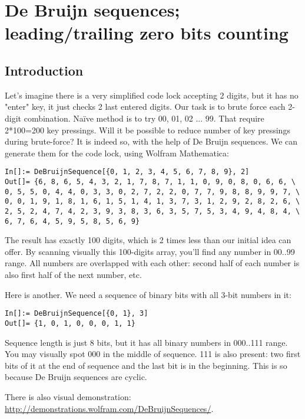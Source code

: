 \section{De Bruijn sequences; leading/trailing zero bits counting}
\label{DeBruijn}

\subsection{Introduction}

Let's imagine there is a very simplified code lock accepting 2 digits, but it has no "enter" key, it just checks 2 last entered digits.
Our task is to brute force each 2-digit combination.
Naïve method is to try 00, 01, 02 ... 99.
That require 2*100=200 key pressings.
Will it be possible to reduce number of key pressings during brute-force?
It is indeed so, with the help of De Bruijn sequences.
We can generate them for the code lock, using Wolfram Mathematica:

\begin{lstlisting}
In[]:= DeBruijnSequence[{0, 1, 2, 3, 4, 5, 6, 7, 8, 9}, 2]
Out[]= {6, 8, 6, 5, 4, 3, 2, 1, 7, 8, 7, 1, 1, 0, 9, 0, 8, 0, 6, 6, \
0, 5, 5, 0, 4, 4, 0, 3, 3, 0, 2, 7, 2, 2, 0, 7, 7, 9, 8, 8, 9, 9, 7, \
0, 0, 1, 9, 1, 8, 1, 6, 1, 5, 1, 4, 1, 3, 7, 3, 1, 2, 9, 2, 8, 2, 6, \
2, 5, 2, 4, 7, 4, 2, 3, 9, 3, 8, 3, 6, 3, 5, 7, 5, 3, 4, 9, 4, 8, 4, \
6, 7, 6, 4, 5, 9, 5, 8, 5, 6, 9}
\end{lstlisting}

The result has exactly 100 digits, which is 2 times less than our initial idea can offer.
By scanning visually this 100-digits array, you'll find any number in 00..99 range.
All numbers are overlapped with each other: second half of each number is also first half of the next number, etc.

Here is another. We need a sequence of binary bits with all 3-bit numbers in it:

\begin{lstlisting}
In[]:= DeBruijnSequence[{0, 1}, 3]
Out[]= {1, 0, 1, 0, 0, 0, 1, 1}
\end{lstlisting}

Sequence length is just 8 bits, but it has all binary numbers in 000..111 range.
You may visually spot 000 in the middle of sequence.
111 is also present: two first bits of it at the end of sequence and the last bit is in the beginning.
This is so because De Bruijn sequences are cyclic.

There is also visual demonstration: \url{http://demonstrations.wolfram.com/DeBruijnSequences/}.

